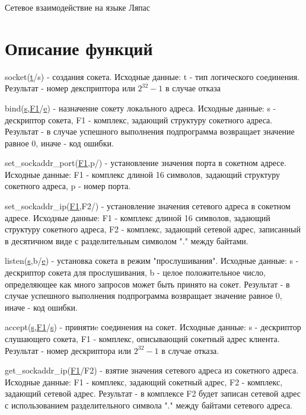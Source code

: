 \documentclass[12t,english,russian]{article}
\begin{document}
\huge
\begin{center}
{Сетевое взаимодействие на языке Ляпас}
\end{center}
\Large
\tableofcontents
\newpage

\large
\section[Описание функций]{Описание функций}
\label{socket}
\hspace{\parindent}
socket(\hyperref[type]{t}/s) - создания сокета. Исходные данные: t - тип логического соединения. Результат - номер дексприптора или $2^{32}-1$ в случае отказа

\label{bind}
bind(\hyperref[socket]{s},\hyperref[sockaddr]{F1}/\hyperref[error]{e}) - назначение сокету локального адреса. Исходные данные: s - дескриптор сокета, F1 - комплекс, задающий структуру сокетного адреса. Результат - в случае успешного выполнения подпрограмма возвращает значение равное 0, иначе - код ошибки.

\label{set_sockaddr_port}
set\_sockaddr\_port(\hyperref[sockaddr]{F1},p/) - установление значения порта в сокетном адресе. Исходные данные: F1 - комплекс длиной 16 символов, задающий структуру сокетного адреса, p - номер порта.

\label{set_sockaddr_ip}
set\_sockaddr\_ip(\hyperref[sockaddr]{F1},F2/) - установление значения сетевого адреса в сокетном адресе. Исходные данные: F1 - комплекс длиной 16 символов, задающий структуру сокетного адреса, F2 - комплекс, задающий сетевой адрес, записанный в десятичном виде с разделительным символом "." между байтами.

\label{listen}
listen(\hyperref[socket]{s},b/\hyperref[error]{e}) - установка сокета в режим "прослушивания". Исходные данные: s - дескриптор сокета для прослушивания, b - целое положительное число, определяющее как много запросов может быть принято на сокет. Результат - в случае успешного выполнения подпрограмма возвращает значение равное 0, иначе - код ошибки.

\label{accept}
accept(\hyperref[socket]{s},\hyperref[sockaddr]{F1}/\hyperref[socket]{s}) - принятиe соединения на сокет. Исходные данные: s - дескриптор слушающего сокета, F1 - комплекс, описывающий сокетный адрес клиента. Результат - номер дескриптора или $2^{32}-1$ в случае отказа.

get\_sockaddr\_ip(\hyperref[sockaddr]{F1}/F2) - взятие значения сетевого адреса из сокетного адреса. Исходные данные: F1 - комплекс, задающий сокетный адрес, F2 - комплекс, задающий сетевой адрес. Результат - в комплексе F2 будет записан сетевой адрес с использованием разделительного символа "." между байтами сетевого адреса.
\end{document}
